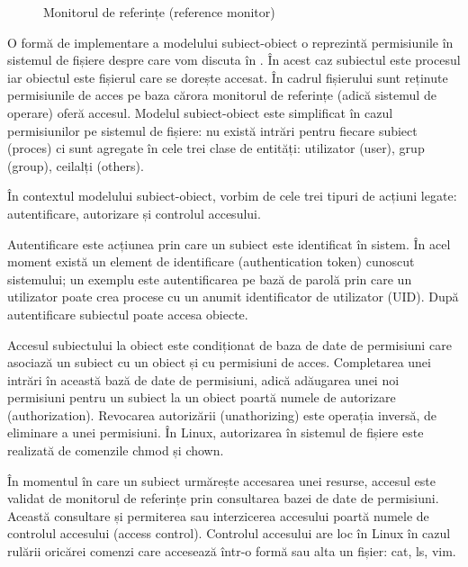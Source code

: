 \begin{figure}[htbp]
  \centering
  \def\svgwidth{\columnwidth}
  
  \caption{Monitorul de referințe (reference monitor)}
  \label{fig:sec:reference-monitor}
\end{figure}

O formă de implementare a modelului subiect-obiect o reprezintă permisiunile în sistemul de fișiere despre care vom discuta în . În acest caz subiectul este procesul iar obiectul este fișierul care se dorește accesat. În cadrul fișierului sunt reținute permisiunile de acces pe baza cărora monitorul de referințe (adică sistemul de operare) oferă accesul. Modelul subiect-obiect este simplificat în cazul permisiunilor pe sistemul de fișiere: nu există intrări pentru fiecare subiect (proces) ci sunt agregate în cele trei clase de entități: utilizator (user), grup (group), ceilalți (others).

În contextul modelului subiect-obiect, vorbim de cele trei tipuri de acțiuni legate: autentificare, autorizare și controlul accesului.

Autentificare este acțiunea prin care un subiect este identificat în sistem. În acel moment există un element de identificare (authentication token) cunoscut sistemului; un exemplu este autentificarea pe bază de parolă prin care un utilizator poate crea procese cu un anumit identificator de utilizator (UID). După autentificare subiectul poate accesa obiecte.

Accesul subiectului la obiect este condiționat de baza de date de permisiuni care asociază un subiect cu un obiect și cu permisiuni de acces. Completarea unei intrări în această bază de date de permisiuni, adică adăugarea unei noi permisiuni pentru un subiect la un obiect poartă numele de autorizare (authorization). Revocarea autorizării (unathorizing) este operația inversă, de eliminare a unei permisiuni. În Linux, autorizarea în sistemul de fișiere este realizată de comenzile chmod și chown.

În momentul în care un subiect urmărește accesarea unei resurse, accesul este validat de monitorul de referințe prin consultarea bazei de date de permisiuni. Această consultare și permiterea sau interzicerea accesului poartă numele de controlul accesului (access control). Controlul accesului are loc în Linux în cazul rulării oricărei comenzi care accesează într-o formă sau alta un fișier: cat, ls, vim.

